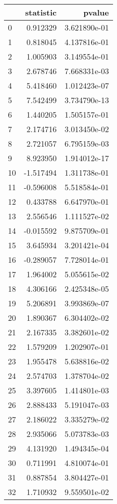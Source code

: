 \begin{tabular}{lrr}
\toprule
{} &  statistic &        pvalue \\
\midrule
0  &   0.912329 &  3.621890e-01 \\
1  &   0.818045 &  4.137816e-01 \\
2  &   1.005903 &  3.149554e-01 \\
3  &   2.678746 &  7.668331e-03 \\
4  &   5.418460 &  1.012423e-07 \\
5  &   7.542499 &  3.734790e-13 \\
6  &   1.440205 &  1.505157e-01 \\
7  &   2.174716 &  3.013450e-02 \\
8  &   2.721057 &  6.795159e-03 \\
9  &   8.923950 &  1.914012e-17 \\
10 &  -1.517494 &  1.311738e-01 \\
11 &  -0.596008 &  5.518584e-01 \\
12 &   0.433788 &  6.647970e-01 \\
13 &   2.556546 &  1.111527e-02 \\
14 &  -0.015592 &  9.875709e-01 \\
15 &   3.645934 &  3.201421e-04 \\
16 &  -0.289057 &  7.728014e-01 \\
17 &   1.964002 &  5.055615e-02 \\
18 &   4.306166 &  2.425348e-05 \\
19 &   5.206891 &  3.993869e-07 \\
20 &   1.890367 &  6.304402e-02 \\
21 &   2.167335 &  3.382601e-02 \\
22 &   1.579209 &  1.202907e-01 \\
23 &   1.955478 &  5.638816e-02 \\
24 &   2.574703 &  1.378704e-02 \\
25 &   3.397605 &  1.414801e-03 \\
26 &   2.888433 &  5.191047e-03 \\
27 &   2.186022 &  3.335279e-02 \\
28 &   2.935066 &  5.073783e-03 \\
29 &   4.131920 &  1.494345e-04 \\
30 &   0.711991 &  4.810074e-01 \\
31 &   0.887854 &  3.804427e-01 \\
32 &   1.710932 &  9.559501e-02 \\

\end{tabular}
